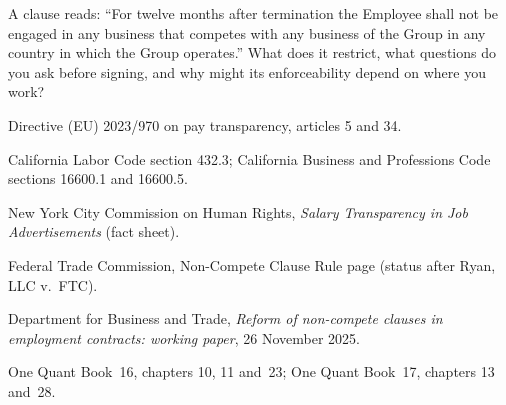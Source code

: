 \begin{interviewq}\label{iq:iv:offers-compensation-and-non-competes:10}
A clause reads: ``For twelve months after termination the Employee shall not be engaged in any business that
competes with any business of the Group in any country in which the Group operates.'' What does it restrict,
what questions do you ask before signing, and why might its enforceability depend on where you work?
\end{interviewq}

\begin{omsources}
\item Directive (EU) 2023/970 on pay transparency, articles 5 and 34.
\item California Labor Code section 432.3; California Business and Professions Code sections 16600.1 and
16600.5.
\item New York City Commission on Human Rights, \emph{Salary Transparency in Job Advertisements} (fact sheet).
\item Federal Trade Commission, Non-Compete Clause Rule page (status after Ryan, LLC v.\ FTC).
\item Department for Business and Trade, \emph{Reform of non-compete clauses in employment contracts: working
paper}, 26 November 2025.
\item One Quant Book~16, chapters 10, 11 and~23; One Quant Book~17, chapters 13 and~28.
\end{omsources}
